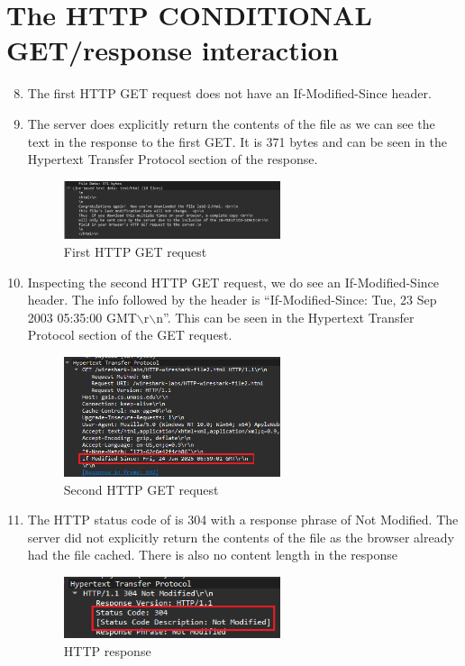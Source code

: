 \documentclass{article}
\begin{document}
\section{The HTTP CONDITIONAL GET/response interaction}
\begin{enumerate}
    \setcounter{enumi}{7}
    \item The first HTTP GET request does not have an If-Modified-Since header. 
    \item The server does explicitly return the contents of the file as we can see the text in the response to the first GET. It is 371 bytes and can be seen in the Hypertext Transfer Protocol section of the response.
    \begin{figure}[ht!]
        \centering
        \includegraphics[width=0.6\textwidth]{p3_1}
        \caption{First HTTP GET request}
        \label{fig:p3_1}
    \end{figure}
    \item Inspecting the second HTTP GET request, we do see an If-Modified-Since header. The info followed by the header is ``If-Modified-Since: Tue, 23 Sep 2003 05:35:00 GMT$\backslash$r$\backslash$n''. This can be seen in the Hypertext Transfer Protocol section of the GET request.
    \begin{figure}[ht!]
        \centering
        \includegraphics[width=0.6\textwidth]{p3_2}
        \caption{Second HTTP GET request}
        \label{fig:p3_2}
    \end{figure}
    \item The HTTP status code of is 304 with a response phrase of Not Modified. The server did not explicitly return the contents of the file as the browser already had the file cached. There is also no content length in the response 
    \begin{figure}[ht!]
        \centering
        \includegraphics[width=0.6\textwidth]{p3_3}
        \caption{HTTP response}
        \label{fig:p3_3}
    \end{figure}
\end{enumerate}
\end{document}

